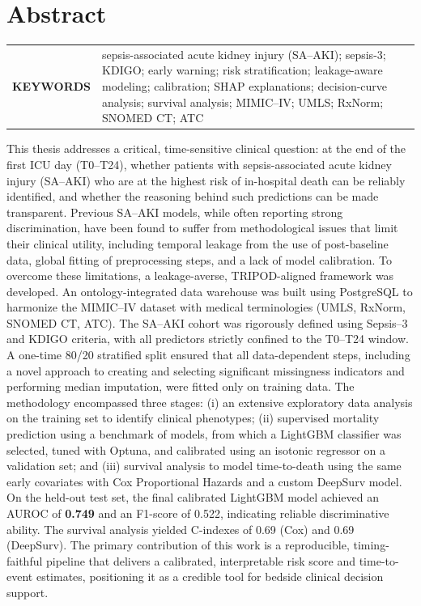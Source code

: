 \chapter{Abstract} \begin{tabular}{@{} >{\bfseries}p{} p{} @{}} \MakeUppercase{Keywords} & sepsis-associated acute kidney injury (SA--AKI); sepsis-3; KDIGO; early warning; risk stratification; leakage-aware modeling; calibration; SHAP explanations; decision-curve analysis; survival analysis; MIMIC--IV; UMLS; RxNorm; SNOMED CT; ATC\\ \end{tabular} \par \begin{doublespacing} This thesis addresses a critical, time-sensitive clinical question: at the end of the first ICU day (T0--T24), whether patients with sepsis-associated acute kidney injury (SA--AKI) who are at the highest risk of in-hospital death can be reliably identified, and whether the reasoning behind such predictions can be made transparent. Previous SA--AKI models, while often reporting strong discrimination, have been found to suffer from methodological issues that limit their clinical utility, including temporal leakage from the use of post-baseline data, global fitting of preprocessing steps, and a lack of model calibration. To overcome these limitations, a leakage-averse, TRIPOD-aligned framework was developed. An ontology-integrated data warehouse was built using PostgreSQL to harmonize the MIMIC--IV dataset with medical terminologies (UMLS, RxNorm, SNOMED CT, ATC). The SA--AKI cohort was rigorously defined using Sepsis--3 and KDIGO criteria, with all predictors strictly confined to the T0--T24 window. A one-time 80/20 stratified split ensured that all data-dependent steps, including a novel approach to creating and selecting significant missingness indicators and performing median imputation, were fitted only on training data. The methodology encompassed three stages: (i) an extensive exploratory data analysis on the training set to identify clinical phenotypes; (ii) supervised mortality prediction using a benchmark of models, from which a LightGBM classifier was selected, tuned with Optuna, and calibrated using an isotonic regressor on a validation set; and (iii) survival analysis to model time-to-death using the same early covariates with Cox Proportional Hazards and a custom DeepSurv model. On the held-out test set, the final calibrated LightGBM model achieved an AUROC of \textbf{0.749} and an F1-score of 0.522, indicating reliable discriminative ability. The survival analysis yielded C-indexes of 0.69 (Cox) and 0.69 (DeepSurv). The primary contribution of this work is a reproducible, timing-faithful pipeline that delivers a calibrated, interpretable risk score and time-to-event estimates, positioning it as a credible tool for bedside clinical decision support. \end{doublespacing}